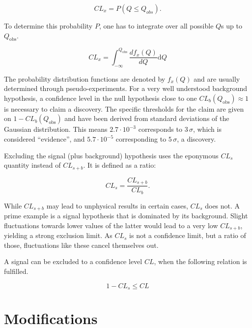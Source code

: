 \begin{equation}
  \label{eq:cl-prob}
  CL_x = P (Q \leq Q_{obs}).
\end{equation}

To determine this probability $P$, one has to integrate over all possible $Q$s up to $Q_{\text{obs}}$.

\begin{equation}
  \label{eq:clx}
  CL_x = \int^{Q_{\text{obs}}}_{-\infty} \frac{d f_x(Q)}{d Q} \text{d} Q
\end{equation}

\noindent The probability distribution functions are denoted by $f_x(Q)$ and are usually determined through pseudo-experiments. For a very well understood background hypothesis, a confidence level in the null hypothesis close to one $CL_b (Q_{\text{obs}}) \approx 1$ is necessary to claim a discovery. The specific thresholds for the claim are given on $1 - CL_b (Q_{\text{obs}})$ and have been derived from standard deviations of the Gaussian distribution. This means $2.7 \cdot 10^{-3}$ corresponds to $3\,\sigma$, which is considered ``evidence'', and $5.7 \cdot 10^{-5}$ corresponding to $5\,\sigma$, a discovery.

Excluding the signal (plus background) hypothesis uses the eponymous $CL_s$ quantity instead of $CL_{s+b}$. It is defined as a ratio:

\begin{equation}
  \label{eq:cls}
  CL_s = \frac{CL_{s+b}}{CL_b}.
\end{equation}

\noindent While $CL_{s+b}$ may lead to unphysical results in certain cases, $CL_s$ does not. A prime example is a signal hypothesis that is dominated by its background. Slight fluctuations towards lower values of the latter would lead to a very low $CL_{s+b}$, yielding a strong exclusion limit. As $CL_s$ is not a confidence limit, but a ratio of those, fluctuations like these cancel themselves out.

A signal can be excluded to a confidence level $CL$, when the following relation is fulfilled.

\begin{equation}
  \label{eq:cl-excl}
  1 - CL_s \leq CL
\end{equation}

\section{Modifications}
\label{sec:mods}

